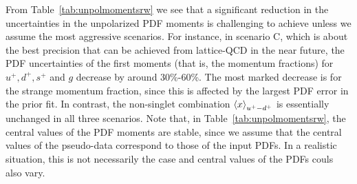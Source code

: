 From Table~\ref{tab:unpolmomentsrw} we see that a significant
reduction in the uncertainties in the unpolarized PDF moments is challenging 
to achieve unless we assume the most aggressive scenarios.
%
For instance, in scenario C, which is about the best precision that
can be achieved from lattice-QCD in the near future, the PDF uncertainties 
of the first moments (that is, the momentum fractions) for $u^+,d^+,s^+$ and 
$g$ decrease by around 30\%-60\%.
%
The most marked decrease is for the strange momentum fraction, since this is 
affected by the largest PDF error in the prior fit.
%
In contrast, the non-singlet combination $\left\langle x\right\rangle_{u^+-d^+}$ is essentially
unchanged in all three scenarios.
%
Note that, in Table~\ref{tab:unpolmomentsrw}, the central values of the PDF 
moments are stable, since we assume that the central values of the 
pseudo-data correspond to those of the input PDFs. 
%
In a realistic situation, this is not necessarily the case and 
central values of the PDFs couls also vary.

